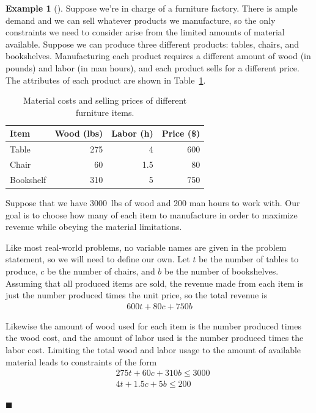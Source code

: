 \documentclass[11pt]{article}
\theoremstyle{definition} %
\newtheorem{ex}{Example}[section] %
\newenvironment{example}[1][]{\begin{ex}[#1]}{\hfill$\blacksquare$\end{ex}} %
\begin{document}
\begin{example}
\label{ex:factory}
	Suppose we're in charge of a furniture factory. There is ample demand and we can sell whatever products we manufacture, so the only constraints we need to consider arise from the limited amounts of material available. Suppose we can produce three different products: tables, chairs, and bookshelves. Manufacturing each product requires a different amount of wood (in pounds) and labor (in man hours), and each product sells for a different price. The attributes of each product are shown in Table~\ref{tab:furniture}.
	
	\begin{table}[h]
		\centering
		\begin{tabular}{l r r r}
			\hline Item & Wood (lbs) & Labor (h) & Price (\$) \\
			\hline Table & 275 & 4 & 600 \\
			Chair & 60 & 1.5 & 80 \\
			Bookshelf & 310 & 5 & 750 \\
			\hline
		\end{tabular}
		\caption{Material costs and selling prices of different furniture items.}
		\label{tab:furniture}
	\end{table}
	
	Suppose that we have 3000~lbs of wood and 200 man hours to work with. Our goal is to choose how many of each item to manufacture in order to maximize revenue while obeying the material limitations.
	
	Like most real-world problems, no variable names are given in the problem statement, so we will need to define our own. Let $t$ be the number of tables to produce, $c$ be the number of chairs, and $b$ be the number of bookshelves. Assuming that all produced items are sold, the revenue made from each item is just the number produced times the unit price, so the total revenue is
	\begin{align*}
		600t + 80c + 750b
	\end{align*}
	
	Likewise the amount of wood used for each item is the number produced times the wood cost, and the amount of labor used is the number produced times the labor cost. Limiting the total wood and labor usage to the amount of available material leads to constraints of the form
	\begin{align*}
		& 275t + 60c + 310b \le 3000 \\
		& 4t + 1.5c + 5b \le 200
	\end{align*}
	

\end{example}
\end{document}
